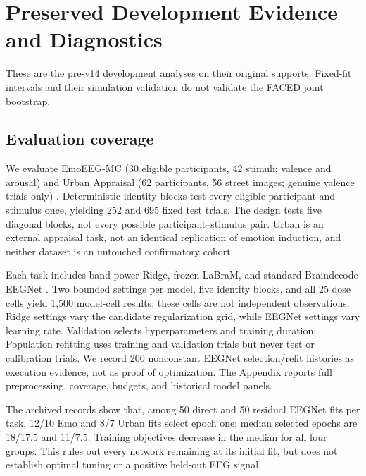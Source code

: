 \section{Preserved Development Evidence and Diagnostics}
\label{app:development-v13}
These are the pre-v14 development analyses on their original supports. Fixed-fit
intervals and their simulation validation do not validate the FACED joint bootstrap.

\subsection{Evaluation coverage}
We evaluate EmoEEG-MC (30 eligible participants, 42 stimuli; valence and
arousal) and Urban Appraisal (62 participants, 56 street images; genuine
valence trials only) \citep{openneuro_ds005540,openneuro_ds006850}.
Deterministic identity blocks test every eligible participant and stimulus once,
yielding 252 and 695 fixed test trials. The design tests five diagonal blocks,
not every possible participant--stimulus pair. Urban is an external appraisal
task, not an identical replication of emotion induction, and neither dataset is
an untouched confirmatory cohort.

Each task includes band-power Ridge, frozen LaBraM, and standard Braindecode
EEGNet \citep{jiang2024labram,lawhern2018eegnet}. Two bounded settings per model,
five identity blocks, and all 25 dose cells yield 1,500 model-cell results; these
cells are not independent observations. Ridge settings vary the candidate
regularization grid, while EEGNet settings vary learning rate. Validation
selects hyperparameters and training duration. Population refitting uses
training and validation trials but never test or calibration trials. We record
200 nonconstant EEGNet selection/refit histories as execution evidence, not as
proof of optimization. The Appendix reports full preprocessing, coverage,
budgets, and historical model panels.

The archived records show that, among 50 direct and 50 residual EEGNet fits per
task, 12/10 Emo and 8/7 Urban fits select epoch one; median selected epochs are
18/17.5 and 11/7.5. Training objectives decrease in the median for all four
groups. This rules out every network remaining at its initial fit, but does not
establish optimal tuning or a positive held-out EEG signal.

